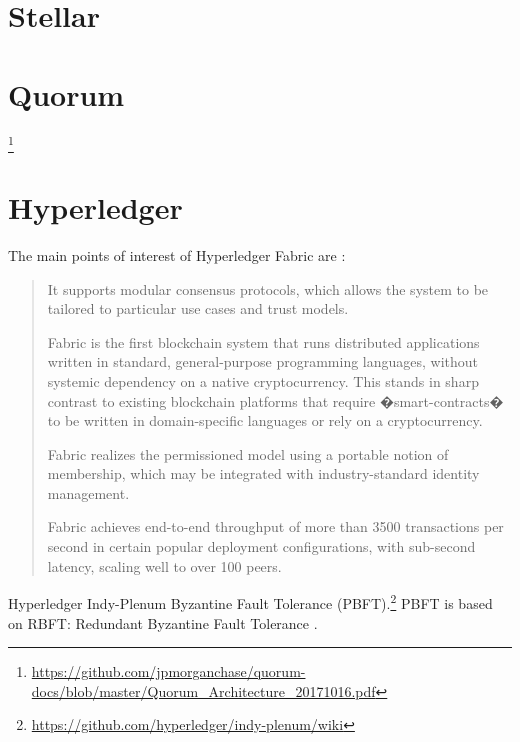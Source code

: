 \section{Stellar}


\section{Quorum}

\footnote{\url{https://github.com/jpmorganchase/quorum-docs/blob/master/Quorum_Architecture_20171016.pdf}}



\section{Hyperledger}
The main points of interest of Hyperledger Fabric are \cite{AndroulakiEtAl2018}:

\begin{quote}
\begin{packed_item1}
\item It supports modular consensus protocols, which allows the system to be tailored to particular use cases and trust models.
\item Fabric is the first blockchain system that runs distributed applications written in standard, general-purpose programming languages, without systemic dependency on a native cryptocurrency. This stands in sharp contrast to existing blockchain platforms that require �smart-contracts� to be written in domain-specific languages or rely on a cryptocurrency.
\item Fabric realizes the permissioned model using a portable notion of membership, which may be integrated with industry-standard identity management.
\item Fabric achieves end-to-end throughput of more than 3500 transactions per second in certain popular deployment configurations, with sub-second latency, scaling well to over 100 peers.
\end{packed_item1}
\end{quote}



Hyperledger Indy-Plenum Byzantine Fault Tolerance (PBFT).\footnote{\url{https://github.com/hyperledger/indy-plenum/wiki}} PBFT is based on RBFT: Redundant Byzantine Fault Tolerance
\cite{Aublinetal2013}.











